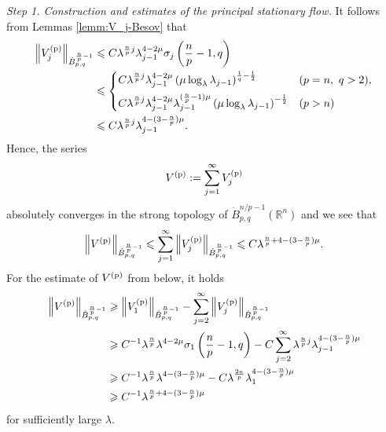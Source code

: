 \documentclass[a4paper,12pt,reqno]{amsart}
\theoremstyle{plain}
\theoremstyle{definition}
\newcommand{\dB}{\dot{B}}
\renewcommand{\leq}{\leqslant}
\renewcommand{\geq}{\geqslant}
\newcommand{\n}[1]{{\left\|#1\right\|}}
\newcommand{\R}{\mathbb{R}}
\renewcommand{\sp}[1]{\left(#1\right)}
\newcommand{\p}{{\rm p}}
\begin{document}
\noindent
{\it Step 1. Construction and estimates of the principal stationary flow.}
%
It follows from Lemmas \ref{lemm:V_j-Besov} that 
\begin{align}\label{est:ser-V^p}
    \n{V_j^{(\p)}}_{\dB_{p,q}^{\frac{n}{p}-1}}
    &
    \leq
    C
    \lambda^{\frac{n}{p}j}
    \lambda_{j-1}^{4-2\mu}
    \sigma_j\sp{\frac{n}{p}-1,q}
    \\
    &
    \leq 
    \begin{cases}
    C
    \lambda^{\frac{n}{p}j}
    \lambda_{j-1}^{4-2\mu}
    \sp{\mu\log_{\lambda}\lambda_{j-1}}^{\frac{1}{q}-\frac{1}{2}}
    & (p=n,\ q>2),
    \\[5pt]
    C
    \lambda^{\frac{n}{p}j}
    \lambda_{j-1}^{4-2\mu}
    \lambda_{j-1}^{(\frac{n}{p}-1)\mu}\sp{\mu\log_{\lambda}\lambda_{j-1}}^{-\frac{1}{2}} & (p>n)
    \end{cases}
    \\
    &
    \leq
    C
    \lambda^{\frac{n}{p}j}
    \lambda_{j-1}^{4-(3-\frac{n}{p})\mu}.
\end{align}
Hence, the series 
\begin{align}
    V^{(\p)}
    :=
    \sum_{j=1}^{\infty}V_j^{(\p)}
\end{align}
absolutely converges in the strong topology of $\dB_{p,q}^{n/p-1}(\R^n)$ and we see that 
\begin{align}
    \n{V^{(\p)}}_{\dB_{p,q}^{\frac{n}{p}-1}} 
    \leq 
    \sum_{j=1}^{\infty}
    \n{V_j^{(\p)}}_{\dB_{p,q}^{\frac{n}{p}-1}} 
    \leq 
    C\lambda^{\frac{n}{p}+4-(3-\frac{n}{p})\mu}.
\end{align}
For the estimate of $V^{(\p)}$ from below, it holds 
\begin{align}
    \n{V^{(\p)}}_{\dB_{p,q}^{\frac{n}{p}-1}}
    \geq{}& 
    \n{V_1^{(\p)}}_{\dB_{p,q}^{\frac{n}{p}-1}}
    -
    \sum_{j=2}^{\infty}
    \n{V_j^{(\p)}}_{\dB_{p,q}^{\frac{n}{p}-1}}
    \\
    \geq{}&
    C^{-1}
    \lambda^{\frac{n}{p}}
    \lambda^{4-2\mu}\sigma_1\sp{\frac{n}{p}-1,q}
    -
    C
    \sum_{j=2}^{\infty}
    \lambda^{\frac{n}{p}j}
    \lambda_{j-1}^{4-(3-\frac{n}{p})\mu}
    \\
    \geq{}& 
    C^{-1}
    \lambda^{\frac{n}{p}}
    \lambda^{4-(3-\frac{n}{p})\mu}
    -
    C
    \lambda^{\frac{2n}{p}}
    \lambda_{1}^{4-(3-\frac{n}{p})\mu}
    \\
    \geq{}& 
    C^{-1}
    \lambda^{\frac{n}{p}+4-(3-\frac{n}{p})\mu}
\end{align}
for sufficiently large $\lambda$.
\end{document}
